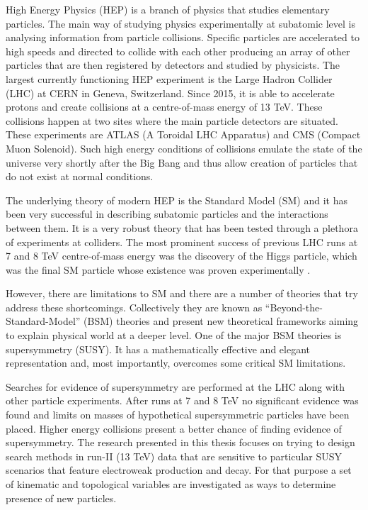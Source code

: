 High Energy Physics (HEP) is a branch of physics that studies elementary particles. The main way of studying physics experimentally at subatomic level is analysing information from particle collisions. Specific particles are accelerated to high speeds and directed to collide with each other producing an array of other particles that are then registered by detectors and studied by physicists. The largest currently functioning HEP experiment is the Large Hadron Collider (LHC) at CERN in Geneva, Switzerland. Since 2015, it is able to accelerate protons and create collisions at a centre-of-mass energy of 13 TeV. These collisions happen at two sites where the main particle detectors are situated. These experiments are ATLAS (A Toroidal LHC Apparatus) and CMS (Compact Muon Solenoid). Such high energy conditions of collisions emulate the state of the universe very shortly after the Big Bang and thus allow creation of particles that do not exist at normal conditions. 

The underlying theory of modern HEP is the Standard Model (SM) and it has been very successful in describing subatomic particles and the interactions between them. It is a very robust theory that has been tested through a plethora of experiments at colliders. The most prominent success of previous LHC runs at 7 and 8 TeV centre-of-mass energy was the discovery of the Higgs particle, which 
was the final SM particle whose existence was proven experimentally \citep{Aad:2012tfa,chatrchyan2012observation}.   

However, there are limitations to SM and there are a number of theories that try address these shortcomings. Collectively they are known as “Beyond-the-Standard-Model” (BSM) theories and present new theoretical frameworks aiming to explain physical world at a deeper level. One of the major BSM theories is supersymmetry (SUSY). It has a mathematically effective and elegant representation and, most importantly, overcomes some critical SM limitations.

Searches for evidence of supersymmetry are performed at the LHC along with other particle experiments. After runs at 7 and 8 TeV no significant evidence was found and limits on masses of hypothetical supersymmetric particles have been placed. Higher energy collisions present a better chance of finding  evidence of supersymmetry. The research presented in this thesis focuses on trying to design search methods in run-II (13 TeV) data that are sensitive to particular SUSY scenarios that feature electroweak production and decay. For that purpose a set of kinematic and topological variables are investigated as ways to determine presence of new particles.
